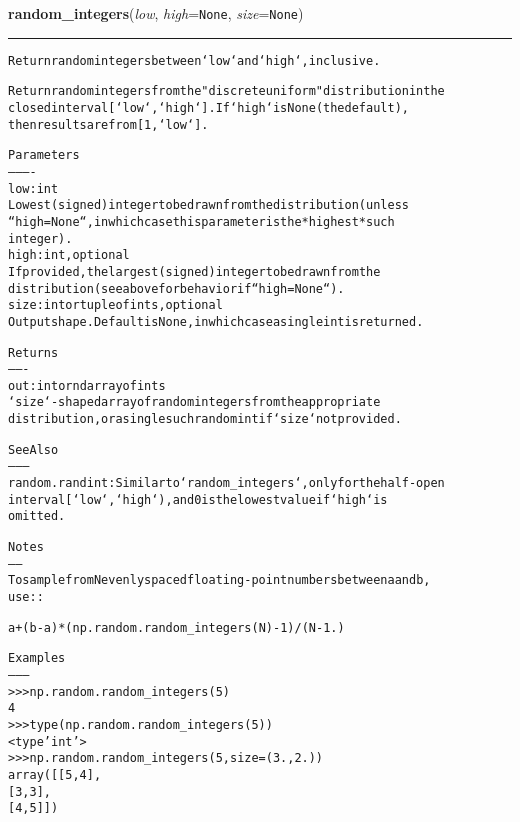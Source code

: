     \label{QSTK:qstklearn:mldiagnostics:random_integers}

    \vspace{0.5ex}

\hspace{.8\funcindent}\begin{boxedminipage}{\funcwidth}

    \raggedright \textbf{random\_integers}(\textit{low}, \textit{high}={\tt None}, \textit{size}={\tt None})

    \vspace{-1.5ex}

    \rule{\textwidth}{0.5\fboxrule}
\setlength{\parskip}{2ex}
\begin{alltt}
Return random integers between `low` and `high`, inclusive.

Return random integers from the "discrete uniform" distribution in the
closed interval [`low`, `high`].  If `high` is None (the default),
then results are from [1, `low`].

Parameters
----------
low : int
    Lowest (signed) integer to be drawn from the distribution (unless
    ``high=None``, in which case this parameter is the *highest* such
    integer).
high : int, optional
    If provided, the largest (signed) integer to be drawn from the
    distribution (see above for behavior if ``high=None``).
size : int or tuple of ints, optional
    Output shape. Default is None, in which case a single int is returned.

Returns
-------
out : int or ndarray of ints
    `size`-shaped array of random integers from the appropriate
    distribution, or a single such random int if `size` not provided.

See Also
--------
random.randint : Similar to `random\_integers`, only for the half-open
    interval [`low`, `high`), and 0 is the lowest value if `high` is
    omitted.

Notes
-----
To sample from N evenly spaced floating-point numbers between a and b,
use::

  a + (b - a) * (np.random.random\_integers(N) - 1) / (N - 1.)

Examples
--------
{\textgreater}{\textgreater}{\textgreater} np.random.random\_integers(5)
4
{\textgreater}{\textgreater}{\textgreater} type(np.random.random\_integers(5))
{\textless}type 'int'{\textgreater}
{\textgreater}{\textgreater}{\textgreater} np.random.random\_integers(5, size=(3.,2.))
array([[5, 4],
       [3, 3],
       [4, 5]])


\end{alltt}
\end{boxedminipage}
